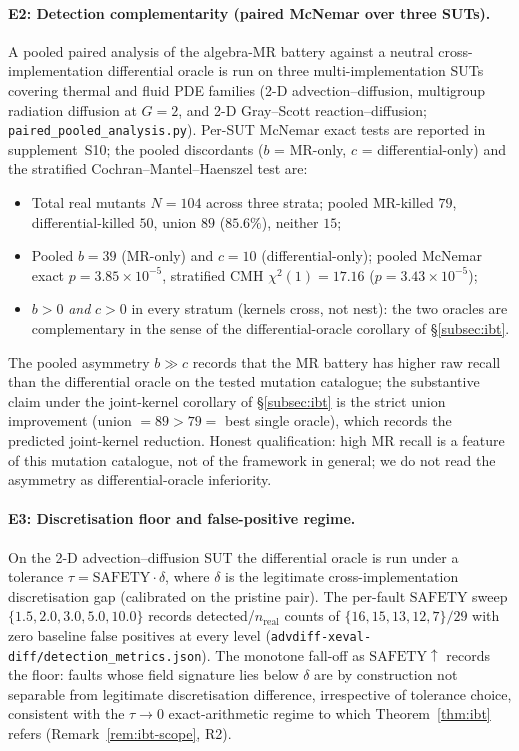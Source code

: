\documentclass[manuscript]{acmart}
\begin{document}
\paragraph{E2: Detection complementarity (paired McNemar over three SUTs).}
A pooled paired analysis of the algebra-MR battery against a neutral cross-implementation differential oracle is run on three multi-implementation SUTs covering thermal and fluid PDE families (2-D advection--diffusion, multigroup radiation diffusion at $G = 2$, and 2-D Gray--Scott reaction--diffusion; \texttt{paired\_pooled\_analysis.py}). Per-SUT McNemar exact tests are reported in supplement~S10; the pooled discordants ($b$ = MR-only, $c$ = differential-only) and the stratified Cochran--Mantel--Haenszel test are:
\begin{itemize}[leftmargin=*,nosep]
  \item Total real mutants $N = 104$ across three strata; pooled MR-killed $79$, differential-killed $50$, union $89$ ($85.6\%$), neither $15$;
  \item Pooled $b = 39$ (MR-only) and $c = 10$ (differential-only); pooled McNemar exact $p = 3.85 \times 10^{-5}$, stratified CMH $\chi^{2}(1) = 17.16$ ($p = 3.43 \times 10^{-5}$);
  \item $b > 0$ \emph{and} $c > 0$ in every stratum (kernels cross, not nest): the two oracles are complementary in the sense of the differential-oracle corollary of \S\ref{subsec:ibt}.
\end{itemize}
The pooled asymmetry $b \gg c$ records that the MR battery has higher raw recall than the differential oracle on the tested mutation catalogue; the substantive claim under the joint-kernel corollary of \S\ref{subsec:ibt} is the strict union improvement (union $= 89 > 79 = $ best single oracle), which records the predicted joint-kernel reduction. Honest qualification: high MR recall is a feature of this mutation catalogue, not of the framework in general; we do not read the asymmetry as differential-oracle inferiority.

\paragraph{E3: Discretisation floor and false-positive regime.}
On the 2-D advection--diffusion SUT the differential oracle is run under a tolerance $\tau = \mathrm{SAFETY} \cdot \delta$, where $\delta$ is the legitimate cross-implementation discretisation gap (calibrated on the pristine pair). The per-fault $\mathrm{SAFETY}$ sweep $\{1.5, 2.0, 3.0, 5.0, 10.0\}$ records detected/$n_{\mathrm{real}}$ counts of $\{16,15,13,12,7\}/29$ with zero baseline false positives at every level (\texttt{advdiff-xeval-diff/detection\_metrics.json}). The monotone fall-off as $\mathrm{SAFETY} \uparrow$ records the floor: faults whose field signature lies below $\delta$ are by construction not separable from legitimate discretisation difference, irrespective of tolerance choice, consistent with the $\tau \to 0$ exact-arithmetic regime to which Theorem~\ref{thm:ibt} refers (Remark~\ref{rem:ibt-scope}, R2).
\end{document}
